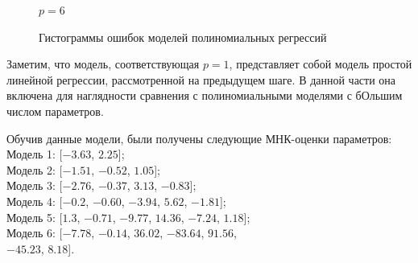 \documentclass[a4paper,12pt]{article}
\begin{document}
\begin{figure}
\begin{minipage}[H]{0.47\linewidth}
    \end{minipage}
    \hfill
    \begin{minipage}[H]{0.47\linewidth}
         $p=6$ \\
    \end{minipage}
    \caption{Гистограммы ошибок моделей полиномиальных регрессий}
    \label{poly_hist_errors}
\end{figure}

Заметим, что модель, соответствующая $p=1$, представляет собой модель простой линейной регрессии, рассмотренной на предыдущем шаге. В данной части она включена для наглядности сравнения с полиномиальными моделями с бОльшим числом параметров.

Обучив данные модели, были получены следующие МНК-оценки параметров:\\
Модель 1: [$-3.63$, $2.25$];\\
Модель 2: [$-1.51$, $-0.52$, $1.05$];\\
Модель 3: [$-2.76$, $-0.37$, $3.13$, $-0.8$3];\\
Модель 4: [$-0.2$, $-0.60$, $-3.94$, $5.62$, $-1.81$];\\
Модель 5: [$1.3$, $-0.71$, $-9.77$, $14.36$, $-7.24$, $1.18$];\\
Модель 6: [$-7.78$, $-0.14$, $36.02$, $-83.64$, $91.56$,\\
    $-45.23$, $8.18$].\\\newline
\end{document}
